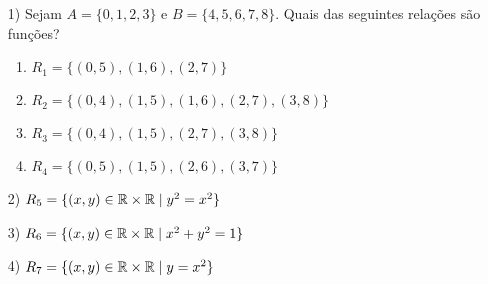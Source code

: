 \documentclass{beamer}
\begin{document}
    \begin{frame}
        \begin{exemplos}
            \begin{enumerate}
                \item[1)] Sejam $A = \{0,1,2,3\}$ \pause e $B = \{4,5,6,7,8\}$. \pause Quais das seguintes rela{\c c}{\~o}es s{\~a}o fun{\c c}{\~o}es?\pause
                \begin{enumerate}[label={\alph*})]
                    \item $R_1 = \{(0,5),(1,6),(2,7)\}$

                    \vspace{1cm}

                    \item $R_2 = \{(0,4),(1,5),(1,6),(2,7),(3,8)\}$

                    \vspace{1cm}

                    \item $R_3 = \{(0,4),(1,5),(2,7),(3,8)\}$

                    \vspace{1cm}

                    \item $R_4 = \{(0,5),(1,5),(2,6),(3,7)\}$

                    \vspace{1cm}
                \end{enumerate}
            \end{enumerate}
        \end{exemplos}
    \end{frame}

    \begin{frame}
        \begin{exemplos}
            \begin{enumerate}
                \item[2)] $R_{5} = \{(x,y) \in \mathbb{R}  \times \mathbb{R}  \mid y^2 = x^2\}$

                \vspace{1cm}

                \item[3)] $R_{6} = \{(x,y) \in \mathbb{R}  \times \mathbb{R}  \mid x^2 + y^2 = 1\}$

                \vspace{1cm}

                \item[4)] $R_{7} = \{(x,y) \in \mathbb{R}  \times \mathbb{R} \mid y = x^2\}$

                \vspace{1.5cm}
            \end{enumerate}
        \end{exemplos}
    \end{frame}
\end{document}
